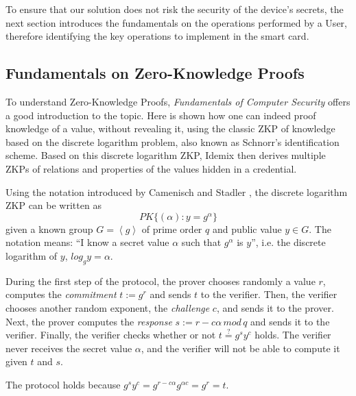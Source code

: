 


To ensure that our solution does not risk the security of the device's secrets, the next section introduces the fundamentals on the operations performed by a User, therefore identifying the key operations to implement in the smart card.

\subsection{Fundamentals on Zero-Knowledge Proofs}


To understand Zero-Knowledge Proofs, \textit{Fundamentals of Computer Security} \cite[Chapter 12]{book:856771} offers a good introduction to the topic. Here is shown how one can indeed proof knowledge of a value, without revealing it, using the classic ZKP of knowledge based on the discrete logarithm problem, also known as Schnorr's identification scheme. Based on this discrete logarithm ZKP, Idemix then derives multiple ZKPs of relations and properties of the values hidden in a credential.


Using the notation introduced by Camenisch and Stadler \cite{camenisch1997efficient}, the discrete logarithm ZKP can be written as 
\[ PK\{ (\alpha) : y = g^\alpha \}  \]
given a known group $G=\left\langle g \right\rangle $ of prime order $q$ and public value $y\in G$. The notation means: ``I know a secret value $\alpha$ such that $g^\alpha$ is $y$'', i.e. the discrete logarithm of $y$, $log_g y = \alpha$.


During the first step of the protocol, the prover chooses randomly a value $r$, computes the \textit{commitment} $t := g^{r}$ and sends $t$ to the verifier. 
Then, the verifier chooses another random exponent, the \textit{challenge} $c$, and sends it to the prover. 
Next, the prover computes the \textit{response} $s:=r-c\alpha\, mod\, q$ and sends it to the verifier.
Finally, the verifier checks whether or not $ t \overset{?}{=} g^{s} y^c $ holds. The verifier never receives the secret value $\alpha$, and the verifier will not be able to compute it given $t$ and $s$.

The protocol holds because $ g^{s} y^c  =  g^{r - c\alpha} g^{\alpha c} = g^{r} = t $.

